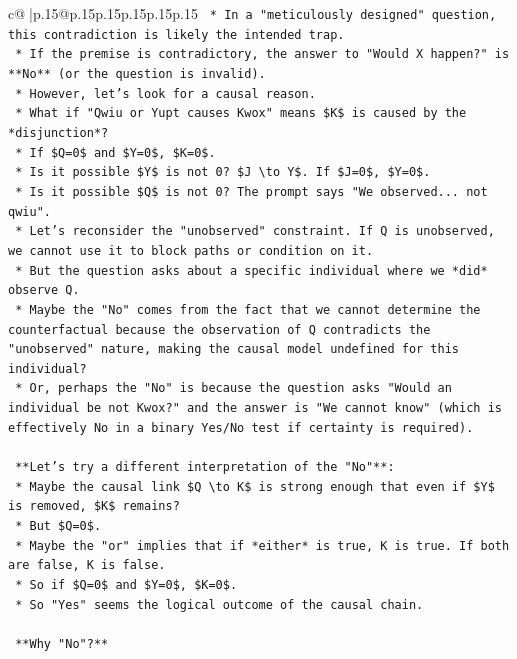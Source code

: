 \documentclass{article}
\begin{document}
{\begin{supertabular}{c@{$\;$}|p{.15\linewidth}@{}p{.15\linewidth}p{.15\linewidth}p{.15\linewidth}p{.15\linewidth}p{.15\linewidth}}
{{{\texttt{    *   In a "meticulously designed" question, this contradiction is likely the intended trap.} \\
\texttt{    *   If the premise is contradictory, the answer to "Would X happen?" is **No** (or the question is invalid).} \\
\texttt{    *   However, let's look for a causal reason.} \\
\texttt{    *   What if "Qwiu or Yupt causes Kwox" means \$K\$ is caused by the *disjunction*?} \\
\texttt{    *   If \$Q=0\$ and \$Y=0\$, \$K=0\$.} \\
\texttt{    *   Is it possible \$Y\$ is not 0? \$J \textbackslash{}to Y\$. If \$J=0\$, \$Y=0\$.} \\
\texttt{    *   Is it possible \$Q\$ is not 0? The prompt says "We observed... not qwiu".} \\
\texttt{    *   Let's reconsider the "unobserved" constraint. If Q is unobserved, we cannot use it to block paths or condition on it.} \\
\texttt{    *   But the question asks about a specific individual where we *did* observe Q.} \\
\texttt{    *   Maybe the "No" comes from the fact that we cannot determine the counterfactual because the observation of Q contradicts the "unobserved" nature, making the causal model undefined for this individual?} \\
\texttt{    *   Or, perhaps the "No" is because the question asks "Would an individual be not Kwox?" and the answer is "We cannot know" (which is effectively No in a binary Yes/No test if certainty is required).} \\
\\ 
\texttt{    **Let's try a different interpretation of the "No"**:} \\
\texttt{    *   Maybe the causal link \$Q \textbackslash{}to K\$ is strong enough that even if \$Y\$ is removed, \$K\$ remains?} \\
\texttt{    *   But \$Q=0\$.} \\
\texttt{    *   Maybe the "or" implies that if *either* is true, K is true. If both are false, K is false.} \\
\texttt{    *   So if \$Q=0\$ and \$Y=0\$, \$K=0\$.} \\
\texttt{    *   So "Yes" seems the logical outcome of the causal chain.} \\
\\ 
\texttt{    **Why "No"?**} \\
}}}
\end{supertabular}}
\end{document}
